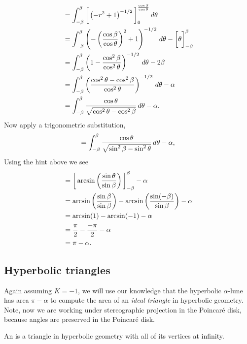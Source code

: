 \documentclass[newpage,hints,12pt,nooutcomes,noauthor,hints,handout]{ximera}
\begin{document}
\begin{problem}
\begin{freeResponse}
\begin{align*}
      &= \int_{-\beta}^\beta \bigg[ \left(-r^2+1\right)^{-1/2} \bigg]_0^{\frac{\cos \beta}{\cos\theta}}\,d \theta\\
      &= \int_{-\beta}^\beta \left(-\left(\frac{\cos \beta}{\cos\theta}\right)^2+1\right)^{-1/2}\,d\theta - \bigg[ \theta \bigg]_{-\beta}^\beta\\
      &= \int_{-\beta}^\beta \left(1-\frac{\cos^2 \beta}{\cos^2\theta}\right)^{-1/2}\,d \theta -2\beta\\
      &= \int_{-\beta}^\beta \left(\frac{\cos^2\theta - \cos^2 \beta}{\cos^2\theta}\right)^{-1/2} \,d \theta-\alpha\\
      &= \int_{-\beta}^\beta \frac{\cos\theta}{\sqrt{\cos^2\theta - \cos^2 \beta}}\,d \theta - \alpha.
    \end{align*}
    Now apply a trigonometric substitution,
    \[
    = \int_{-\beta}^\beta \frac{\cos\theta}{\sqrt{\sin^2\beta - \sin^2 \theta}}\,d \theta- \alpha,
    \]
    Using the hint above we see
    \begin{align*}
      &= \bigg[ \arcsin\left(\frac{\sin\theta}{\sin\beta}\right) \bigg]_{-\beta}^\beta - \alpha\\
      &= \arcsin\left(\frac{\sin\beta}{\sin\beta}\right)- \arcsin\left(\frac{\sin(-\beta)}{\sin\beta}\right)- \alpha\\
      &= \arcsin(1)-\arcsin(-1)-\alpha\\
      &= \frac{\pi}{2}-\frac{-\pi}{2}-\alpha\\
      &= \pi-\alpha.
    \end{align*}
  \end{freeResponse}
\end{problem}


\subsection{Hyperbolic triangles}

Again assuming $K=-1$, we will use our knowledge that the hyperbolic
$\alpha$-lune has area $\pi-\alpha$ to compute the area of an
\textit{ideal triangle} in hyperbolic geometry. Note, now we are
working under stereographic projection in the Poincar\'e disk, because
angles are preserved in the Poincar\'e disk.

\begin{definition}
  An  is a triangle in hyperbolic geometry with all of
  its vertices at infinity.
\end{definition}
\end{document}
